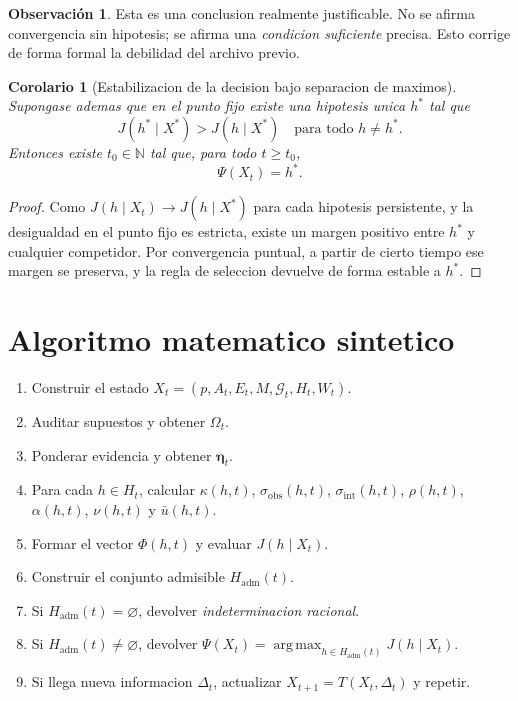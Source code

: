 \documentclass[12pt,a4paper]{article}
\newcommand{\N}{\mathbb{N}}
\newcommand{\argmax}{\operatorname*{arg\,max}}
\theoremstyle{definition}
\newtheorem{remark}[definition]{Observaci\'on}
\theoremstyle{plain}
\newtheorem{corollary}[definition]{Corolario}
\theoremstyle{remark}
\begin{document}
\begin{remark}
Esta es una conclusion realmente justificable. No se afirma convergencia sin hipotesis; se afirma una \emph{condicion suficiente} precisa. Esto corrige de forma formal la debilidad del archivo previo.
\end{remark}

\begin{corollary}[Estabilizacion de la decision bajo separacion de maximos]
Supongase ademas que en el punto fijo existe una hipotesis unica $h^*$ tal que
\begin{equation}
J(h^*\mid X^*)>J(h\mid X^*)\quad \text{para todo } h\neq h^*.
\end{equation}
Entonces existe $t_0\in\N$ tal que, para todo $t\ge t_0$,
\begin{equation}
\Psi(X_t)=h^*.
\end{equation}
\end{corollary}

\begin{proof}
Como $J(h\mid X_t)\to J(h\mid X^*)$ para cada hipotesis persistente, y la desigualdad en el punto fijo es estricta, existe un margen positivo entre $h^*$ y cualquier competidor. Por convergencia puntual, a partir de cierto tiempo ese margen se preserva, y la regla de seleccion devuelve de forma estable a $h^*$.
\end{proof}

\section{Algoritmo matematico sintetico}

\begin{enumerate}[leftmargin=1.7em,label=\textbf{Paso \arabic*.}]
    \item Construir el estado $X_t=(p,A_t,E_t,M,\mathcal{G}_t,H_t,W_t)$.
    \item Auditar supuestos y obtener $\Omega_t$.
    \item Ponderar evidencia y obtener $\mathbf{\eta}_t$.
    \item Para cada $h\in H_t$, calcular $\kappa(h,t)$, $\sigma_{\mathrm{obs}}(h,t)$, $\sigma_{\mathrm{int}}(h,t)$, $\rho(h,t)$, $\alpha(h,t)$, $\nu(h,t)$ y $\bar u(h,t)$.
    \item Formar el vector $\Phi(h,t)$ y evaluar $J(h\mid X_t)$.
    \item Construir el conjunto admisible $H_{\mathrm{adm}}(t)$.
    \item Si $H_{\mathrm{adm}}(t)=\varnothing$, devolver \emph{indeterminacion racional}.
    \item Si $H_{\mathrm{adm}}(t)\neq\varnothing$, devolver $\Psi(X_t)=\argmax_{h\in H_{\mathrm{adm}}(t)}J(h\mid X_t)$.
    \item Si llega nueva informacion $\Delta_t$, actualizar $X_{t+1}=T(X_t,\Delta_t)$ y repetir.
\end{enumerate}
\end{document}
